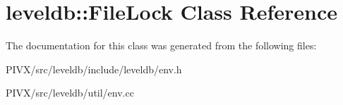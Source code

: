\hypertarget{classleveldb_1_1_file_lock}{}\section{leveldb\+:\+:File\+Lock Class Reference}
\label{classleveldb_1_1_file_lock}


The documentation for this class was generated from the following files\+:\begin{DoxyCompactItemize}
\item 
P\+I\+V\+X/src/leveldb/include/leveldb/env.\+h\item 
P\+I\+V\+X/src/leveldb/util/env.\+cc\end{DoxyCompactItemize}
